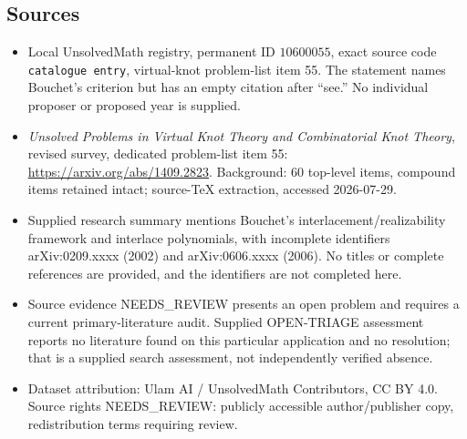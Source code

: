 \documentclass[11pt]{article}
\begin{document}
\subsection{Sources}
\begin{itemize}
\item Local UnsolvedMath registry, permanent ID \(10600055\), exact source code \texttt{catalogue entry}, virtual-knot problem-list item 55. The statement names Bouchet's criterion but has an empty citation after ``see.'' No individual proposer or proposed year is supplied.
\item \emph{Unsolved Problems in Virtual Knot Theory and Combinatorial Knot Theory}, revised survey, dedicated problem-list item 55: \url{https://arxiv.org/abs/1409.2823}. Background: 60 top-level items, compound items retained intact; source-TeX extraction, accessed 2026-07-29.
\item Supplied research summary mentions Bouchet's interlacement/realizability framework and interlace polynomials, with incomplete identifiers arXiv:0209.xxxx (2002) and arXiv:0606.xxxx (2006). No titles or complete references are provided, and the identifiers are not completed here.
\item Source evidence NEEDS\_REVIEW presents an open problem and requires a current primary-literature audit. Supplied OPEN-TRIAGE assessment reports no literature found on this particular application and no resolution; that is a supplied search assessment, not independently verified absence.
\item Dataset attribution: Ulam AI / UnsolvedMath Contributors, CC BY 4.0. Source rights NEEDS\_REVIEW: publicly accessible author/publisher copy, redistribution terms requiring review.
\end{itemize}
\end{document}
